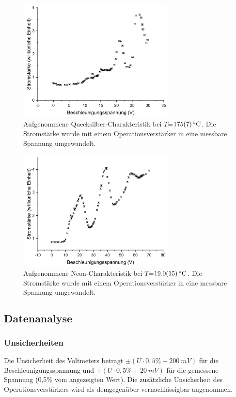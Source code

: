 \documentclass[
	a4paper,
	12pt,
	pagesize,
	ngerman
]{scrartcl}
\begin{document}
	\begin{figure}[H]
		\includegraphics[width=0.7\textwidth]{Hg175}
		\centering
		\caption{Aufgenommene Quecksilber-Charakteristik bei $T$=$\SI{175 +- 7}{\degreeCelsius}$. Die Stromstärke wurde mit einem Operationsverstärker in eine messbare Spannung umgewandelt.}
		\label{Hg175}
		\centering
	\end{figure}

	\begin{figure}[H]
		\includegraphics[width=0.7\textwidth]{Ne19}
		\centering
		\caption{Aufgenommene Neon-Charakteristik bei $T$=$\SI{19,0 +- 1,5}{\degreeCelsius}$. Die Stromstärke wurde mit einem Operationsverstärker in eine messbare Spannung umgewandelt.}
		\label{Ne19}
		\centering
	\end{figure}
	
	\subsection{Datenanalyse}
	\subsubsection{Unsicherheiten}
	Die Unsicherheit des  Voltmeters beträgt $\pm (U \cdot 0,5\% + \SI{200}{mV})$ für die Beschleunigungsspannung und $\pm (U \cdot 0,5\% + \SI{20}{mV})$ für die gemessene Spannung (0,5\% vom angezeigten Wert).\cite{FH-Pforzheim} Die zusätzliche Unsicherheit des Operationsverstärkers wird als demgegenüber vernachlässigbar angenommen. 
	
\end{document}
